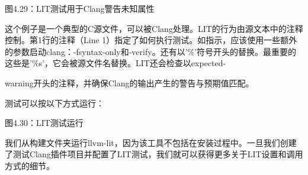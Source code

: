 \begin{center}
图4.29：LIT测试用于Clang警告未知属性
\end{center}

这个例子是一个典型的C源文件，可以被Clang处理。LIT的行为由源文本中的注释控制。第1行的注释（Line 1）指定了如何执行测试。如指示，应该使用一些额外的参数启动clang：-fsyntax-only和-verify。还有以'\%'符号开头的替换。最重要的这些是'\%s'，它会被源文件名替换。LIT还会检查以expected-

warning开头的注释，并确保Clang的输出产生的警告与预期值匹配。

测试可以按以下方式运行：



\begin{center}
图4.30：LIT测试运行
\end{center}

我们从构建文件夹运行llvm-lit，因为该工具不包括在安装过程中。一旦我们创建了测试Clang插件项目并配置了LIT测试，我们就可以获得更多关于LIT设置和调用方式的细节。
















